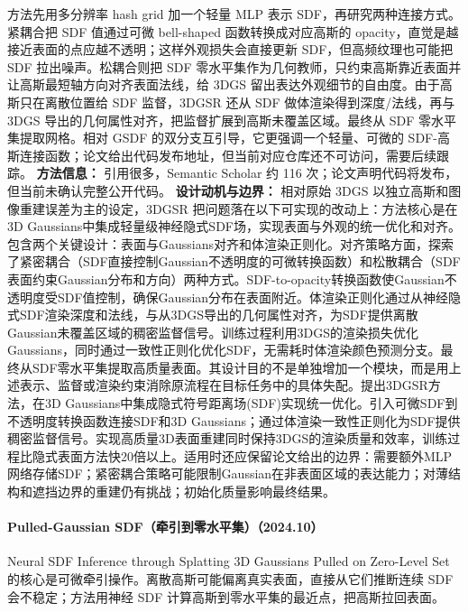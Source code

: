 方法先用多分辨率 hash grid 加一个轻量 MLP 表示 SDF，再研究两种连接方式。紧耦合把 SDF 值通过可微 bell-shaped 函数转换成对应高斯的 opacity，直觉是越接近表面的点应越不透明；这样外观损失会直接更新 SDF，但高频纹理也可能把 SDF 拉出噪声。松耦合则把 SDF 零水平集作为几何教师，只约束高斯靠近表面并让高斯最短轴方向对齐表面法线，给 3DGS 留出表达外观细节的自由度。由于高斯只在离散位置给 SDF 监督，3DGSR 还从 SDF 做体渲染得到深度/法线，再与 3DGS 导出的几何属性对齐，把监督扩展到高斯未覆盖区域。最终从 SDF 零水平集提取网格。相对 GSDF 的双分支互引导，它更强调一个轻量、可微的 SDF-高斯连接函数；论文给出代码发布地址，但当前对应仓库还不可访问，需要后续跟踪。
\textbf{方法信息：} 引用很多，Semantic Scholar 约 116 次；论文声明代码将发布，但当前未确认完整公开代码。
\textbf{设计动机与边界：} 相对原始 3DGS 以独立高斯和图像重建误差为主的设定，3DGSR 把问题落在以下可实现的改动上：方法核心是在3D Gaussians中集成轻量级神经隐式SDF场，实现表面与外观的统一优化和对齐。包含两个关键设计：表面与Gaussians对齐和体渲染正则化。对齐策略方面，探索了紧密耦合（SDF直接控制Gaussian不透明度的可微转换函数）和松散耦合（SDF表面约束Gaussian分布和方向）两种方式。SDF-to-opacity转换函数使Gaussian不透明度受SDF值控制，确保Gaussian分布在表面附近。体渲染正则化通过从神经隐式SDF渲染深度和法线，与从3DGS导出的几何属性对齐，为SDF提供离散Gaussian未覆盖区域的稠密监督信号。训练过程利用3DGS的渲染损失优化Gaussians，同时通过一致性正则化优化SDF，无需耗时体渲染颜色预测分支。最终从SDF零水平集提取高质量表面。其设计目的不是单独增加一个模块，而是用上述表示、监督或渲染约束消除原流程在目标任务中的具体失配。提出3DGSR方法，在3D Gaussians中集成隐式符号距离场(SDF)实现统一优化。引入可微SDF到不透明度转换函数连接SDF和3D Gaussians；通过体渲染一致性正则化为SDF提供稠密监督信号。实现高质量3D表面重建同时保持3DGS的渲染质量和效率，训练过程比隐式表面方法快20倍以上。适用时还应保留论文给出的边界：需要额外MLP网络存储SDF；紧密耦合策略可能限制Gaussian在非表面区域的表达能力；对薄结构和遮挡边界的重建仍有挑战；初始化质量影响最终结果。
\paragraph{Pulled-Gaussian SDF（牵引到零水平集）（2024.10）}
Neural SDF Inference through Splatting 3D Gaussians Pulled on Zero-Level Set~\cite{2410_14189} 的核心是可微牵引操作。离散高斯可能偏离真实表面，直接从它们推断连续 SDF 会不稳定；方法用神经 SDF 计算高斯到零水平集的最近点，把高斯拉回表面。

